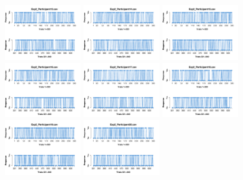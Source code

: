 \begin{figure}[th]
\includegraphics[width=0.30\textwidth]{Figures/Response_Exp2_P13} \includegraphics[width=0.30\textwidth]{Figures/Response_Exp2_P14} \includegraphics[width=0.30\textwidth]{Figures/Response_Exp2_P15}
\includegraphics[width=0.30\textwidth]{Figures/Response_Exp2_P16} \includegraphics[width=0.30\textwidth]{Figures/Response_Exp2_P17} \includegraphics[width=0.30\textwidth]{Figures/Response_Exp2_P18}
\includegraphics[width=0.30\textwidth]{Figures/Response_Exp2_P19} \includegraphics[width=0.30\textwidth]{Figures/Response_Exp2_P20} 

\end{figure}
